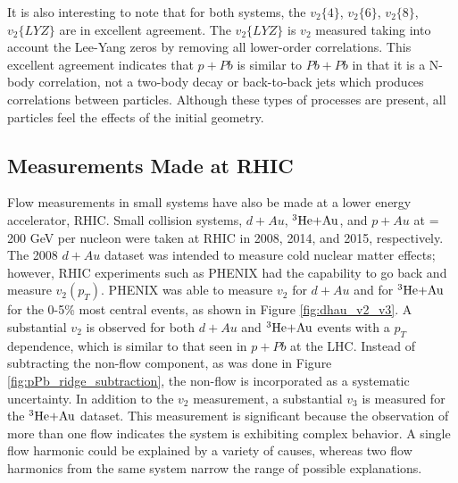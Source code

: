 It is also interesting to note that for both systems, the $v_2\{4\}$, $v_2\{6\}$, $v_2\{8\}$, $v_2\{LYZ\}$ are in excellent agreement. The $v_2\{LYZ\}$ is $v_2$ measured taking into account the Lee-Yang zeros by removing all lower-order correlations. This excellent agreement indicates that $p+Pb$ is similar to $Pb+Pb$ in that it is a N-body correlation, not a two-body decay or back-to-back jets which produces correlations between particles. Although these types of processes are present, all particles feel the effects of the initial geometry.

\subsection{Measurements Made at RHIC}

Flow measurements in small systems have also be made at a lower energy accelerator, RHIC. Small collision systems, $d+Au$, $\mbox{$^3\text{He}$+Au}$, and $p+Au$ at \sqsn = 200 GeV per nucleon were taken at RHIC in 2008, 2014, and 2015, respectively. The 2008 $d+Au$ dataset was intended to measure cold nuclear matter effects; however, RHIC experiments such as PHENIX had the capability to go back and measure $v_2(p_T)$. PHENIX was able to measure $v_2$ for $d+Au$ and for $\mbox{$^3\text{He}$+Au}$ for the 0-5\% most central events, as shown in Figure \ref{fig:dhau_v2_v3}. A substantial $v_2$ is observed for both $d+Au$ and $\mbox{$^3\text{He}$+Au}$ events with a $p_T$ dependence, which is similar to that seen in $p+Pb$ at the LHC. Instead of subtracting the non-flow component, as was done in Figure \ref{fig:pPb_ridge_subtraction}, the non-flow is incorporated as a systematic uncertainty. In addition to the $v_2$ measurement, a substantial $v_3$ is measured for the $\mbox{$^3\text{He}$+Au}$ dataset. This measurement is significant because the observation of more than one flow indicates the system is exhibiting complex behavior. A single flow harmonic could be explained by a variety of causes, whereas two flow harmonics from the same system narrow the range of possible explanations.

